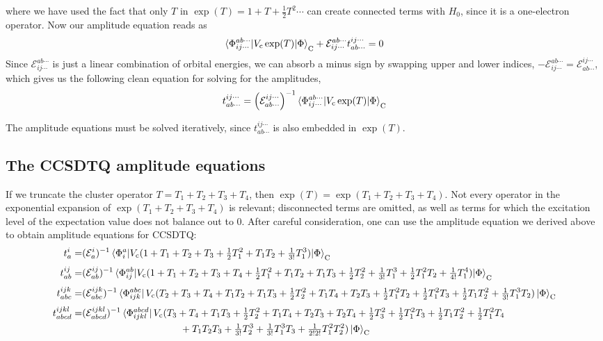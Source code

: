 \documentclass{article}
\newcommand{\mc}{\mathcal}
\newcommand{\mr}{\mathrm}
\newcommand{\cd}{\cdots}
\newcommand{\Vc}{V_{\mathrm{c}}}
\begin{document}
where we have used the fact that only $T$ in $\exp(T) = 1 + T + \frac{1}{2}T^2 \cdots $
can create connected terms with $H_0$, since it is a one-electron operator.
Now our amplitude equation reads as
\[ \braket{ \Phi_{i j \cdots }^{a b \cdots} |\Vc \exp(T) | \Phi}_\mathrm{C}
  + \mathcal{E}_{ij \cd}^{ab \cd} t_{ab \cd}^{ij \cd}   =  0  \]
Since $\mathcal{E}_{ij \cd}^{ab \cd}$ is just a linear combination of orbital
energies, we can absorb a minus sign by swapping upper and lower indices, $-\mathcal{E}_{ij \cd}^{ab \cd} = \mathcal{E}_{ab \cd}^{ij \cd}$,  which gives us the following 
clean equation for solving for the amplitudes,  
\[ t_{ab \cd}^{ij \cd} = \left(\mathcal{E}_{ab \cd}^{ij \cd}\right)^{-1} 
        \braket{ \Phi_{i j \cdots }^{a b \cdots} |\Vc \exp(T) | \Phi}_\mathrm{C}  \]
   
The amplitude equations must be solved iteratively, since $t_{ab \cd}^{ij \cd}$ is
also embedded in $\exp(T)$.

\subsection{The CCSDTQ amplitude equations} 
If we truncate the cluster operator $T = T_1 + T_2 + T_3 + T_4$,
then $\exp(T) = \exp(T_1 + T_2 + T_3 + T_4)$. 
Not every operator in the exponential expansion of $\exp(T_1 + T_2 + T_3 + T_4)$ 
is relevant;
disconnected terms are omitted, as well as terms for which the excitation level
of the expectation value does not balance out to 0.
After careful consideration, one can use the amplitude equation we derived above
to obtain amplitude equations for CCSDTQ:
\begin{align*}
  t_a^i
=& (\mc{E}_a^i)^{-1}
  \braket{\Phi_i^a| V_\mr{c} (1 + T_1 + T_2 + T_3 + \tfrac{1}{2} T_1^2 +T_1T_2 + \tfrac{1}{3!} T_1^3)|\Phi}_\mr{C}
\\[3pt]
  t_{ab}^{ij} =& (\mc{E}_{ab}^{ij})^{-1}
  \braket{\Phi_{ij}^{ab} | V_\mr{c} ( 1 + T_1 + T_2 +  T_3 + T_4 + \tfrac{1}{2}T_1^2 +  T_1T_2 +  T_1T_3 +  \tfrac{1}{2} T_2^2
    + \tfrac{1}{3!} T_1^3 +  \tfrac{1}{2} T_1^2T_2 + \tfrac{1}{4!} T_1^4 ) | \Phi}_\mr{C} 
\\[3pt] 
  t_{abc}^{ijk}
=& (\mc{E}_{abc}^{ijk})^{-1}
  \bra{\Phi_{ijk}^{abc}} V_\mr{c}
    (T_2 + T_3 + T_4 + T_1T_2 + T_1T_3 + \tfrac{1}{2} T_2^2 +T_1T_4 + T_2T_3 + \tfrac{1}{2}T_1^2T_2 + \tfrac{1}{2}T_1^2T_3 + \tfrac{1}{2}T_1T_2^2
    + \tfrac{1}{3!}T_1^3T_2) \ket{\Phi}_\mr{C}
\\[3pt]
  t_{abcd}^{ijkl}
=&
  (\mc{E}_{abcd}^{ijkl})^{-1} \bra{\Phi_{ijkl}^{abcd}} V_\mr{c}
    (T_3 + T_4 + T_1T_3 + \tfrac{1}{2} T_2^2 + T_1T_4 + T_2T_3 + T_2T_4 + \tfrac{1}{2} T_3^2 +
      \tfrac{1}{2} T_1^2T_3  + \tfrac{1}{2} T_1T_2^2 + \tfrac{1}{2} T_1^2T_4
\\
&
\hphantom{
  (\mc{E}_{abcd}^{ijkl})^{-1}
  \bra{\Phi_{ijkl}^{abcd}}
    V_\mr{c}
    (
      T_3\
 }
    + T_1T_2T_3 + \tfrac{1}{3!} T_2^3 +\tfrac{1}{3!}T_1^3T_3 + \tfrac{1}{2!2!}T_1^2T_2^2)
  \ket{\Phi}_\mr{C}
\end{align*}
\end{document}

